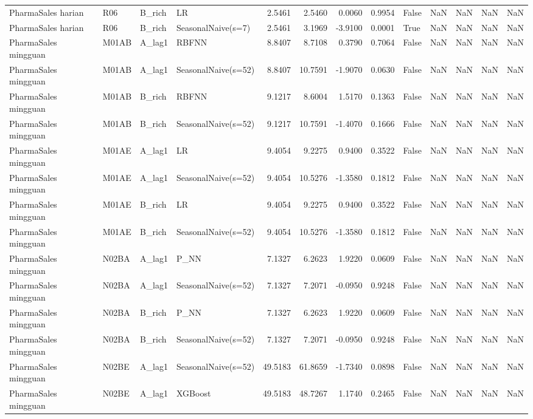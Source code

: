 \begin{table}
\begin{tabular}{llllrrrrllrrl}
PharmaSales harian & R06 & B\_rich & LR & 2.5461 & 2.5460 & 0.0060 & 0.9954 & False & NaN & NaN & NaN & NaN \\
PharmaSales harian & R06 & B\_rich & SeasonalNaive(s=7) & 2.5461 & 3.1969 & -3.9100 & 0.0001 & True & NaN & NaN & NaN & NaN \\
PharmaSales mingguan & M01AB & A\_lag1 & RBFNN & 8.8407 & 8.7108 & 0.3790 & 0.7064 & False & NaN & NaN & NaN & NaN \\
PharmaSales mingguan & M01AB & A\_lag1 & SeasonalNaive(s=52) & 8.8407 & 10.7591 & -1.9070 & 0.0630 & False & NaN & NaN & NaN & NaN \\
PharmaSales mingguan & M01AB & B\_rich & RBFNN & 9.1217 & 8.6004 & 1.5170 & 0.1363 & False & NaN & NaN & NaN & NaN \\
PharmaSales mingguan & M01AB & B\_rich & SeasonalNaive(s=52) & 9.1217 & 10.7591 & -1.4070 & 0.1666 & False & NaN & NaN & NaN & NaN \\
PharmaSales mingguan & M01AE & A\_lag1 & LR & 9.4054 & 9.2275 & 0.9400 & 0.3522 & False & NaN & NaN & NaN & NaN \\
PharmaSales mingguan & M01AE & A\_lag1 & SeasonalNaive(s=52) & 9.4054 & 10.5276 & -1.3580 & 0.1812 & False & NaN & NaN & NaN & NaN \\
PharmaSales mingguan & M01AE & B\_rich & LR & 9.4054 & 9.2275 & 0.9400 & 0.3522 & False & NaN & NaN & NaN & NaN \\
PharmaSales mingguan & M01AE & B\_rich & SeasonalNaive(s=52) & 9.4054 & 10.5276 & -1.3580 & 0.1812 & False & NaN & NaN & NaN & NaN \\
PharmaSales mingguan & N02BA & A\_lag1 & P\_NN & 7.1327 & 6.2623 & 1.9220 & 0.0609 & False & NaN & NaN & NaN & NaN \\
PharmaSales mingguan & N02BA & A\_lag1 & SeasonalNaive(s=52) & 7.1327 & 7.2071 & -0.0950 & 0.9248 & False & NaN & NaN & NaN & NaN \\
PharmaSales mingguan & N02BA & B\_rich & P\_NN & 7.1327 & 6.2623 & 1.9220 & 0.0609 & False & NaN & NaN & NaN & NaN \\
PharmaSales mingguan & N02BA & B\_rich & SeasonalNaive(s=52) & 7.1327 & 7.2071 & -0.0950 & 0.9248 & False & NaN & NaN & NaN & NaN \\
PharmaSales mingguan & N02BE & A\_lag1 & SeasonalNaive(s=52) & 49.5183 & 61.8659 & -1.7340 & 0.0898 & False & NaN & NaN & NaN & NaN \\
PharmaSales mingguan & N02BE & A\_lag1 & XGBoost & 49.5183 & 48.7267 & 1.1740 & 0.2465 & False & NaN & NaN & NaN & NaN \\

\end{tabular}
\end{table}
